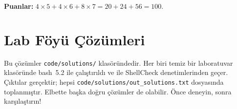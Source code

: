 \textbf{Puanlar:} $4 \times 5 + 4 \times 6 + 8 \times 7 = 20 + 24 + 56 = 100$.

\section{Lab Föyü Çözümleri}

Bu çözümler \texttt{code/solutions/} klasöründedir. Her biri temiz bir laboratuvar klasöründe bash~5.2 ile çalıştırıldı ve  ile ShellCheck denetimlerinden geçer. Çıktılar gerçektir; hepsi \nolinkurl{code/solutions/out_solutions.txt} dosyasında toplanmıştır. Elbette başka doğru çözümler de olabilir. Önce deneyin, sonra karşılaştırın!

\newcommand{\sol}[4]{\Needspace{6\baselineskip}\par\smallskip{\headfont\bfseries\color{mintdeep}#1}}


